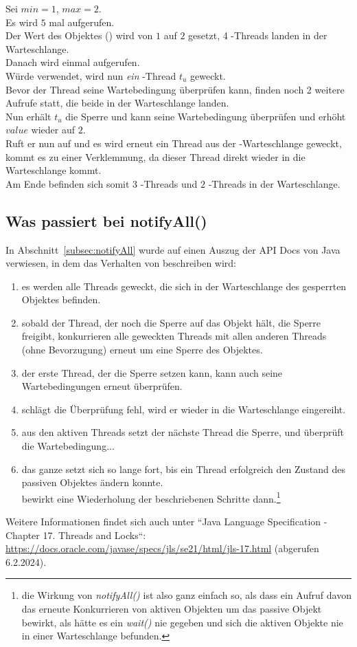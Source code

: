 \noindent
Sei $min = 1$, $max = 2$.\\
Es wird $5$ mal  aufgerufen.\\
Der Wert des Objektes () wird von $1$ auf $2$ gesetzt, 4 -Threads landen in der Warteschlange.\\
Danach wird einmal  aufgerufen.\\
Würde  verwendet, wird nun \textit{ein} -Thread $t_u$ geweckt.\\
Bevor der Thread seine Wartebedingung überprüfen kann, finden noch 2 weitere  Aufrufe statt, die beide in der Warteschlange landen.\\
Nun erhält $t_u$ die Sperre und kann seine Wartebedingung überprüfen und erhöht $value$ wieder auf $2$.\\
Ruft er nun  auf und es wird erneut ein Thread aus der -Warteschlange geweckt, kommt es zu einer Verklemmung, da dieser Thread direkt wieder in die Warteschlange kommt.\\
Am Ende befinden sich somit $3$ -Threads und $2$ -Threads in der Warteschlange.


\subsection*{Was passiert bei notifyAll()}

In Abschnitt~\ref{subsec:notifyAll} wurde auf einen Auszug der API Docs von Java verwiesen, in dem das Verhalten von  beschreiben wird:

\begin{enumerate}
    \item es werden alle Threads geweckt, die sich in der Warteschlange des gesperrten Objektes befinden.
    \item sobald der Thread, der noch die Sperre auf das Objekt hält, die Sperre freigibt, konkurrieren alle geweckten Threads mit allen anderen Threads (ohne Bevorzugung) erneut um eine Sperre des Objektes.
    \item der erste Thread, der die Sperre setzen kann, kann auch seine Wartebedingungen erneut überprüfen.
    \item schlägt die Überprüfung fehl, wird er wieder in die Warteschlange eingereiht.
    \item aus den aktiven Threads setzt der nächste Thread die Sperre, und überprüft die Wartebedingung...
    \item das ganze setzt sich so lange fort, bis ein Thread erfolgreich den Zustand des passiven Objektes ändern konnte.\\
     bewirkt eine Wiederholung der beschriebenen Schritte dann.\footnote{
        die Wirkung von \textit{notifyAll()} ist also ganz einfach so, als dass ein Aufruf davon das erneute Konkurrieren von aktiven Objekten um das passive Objekt bewirkt, als hätte es ein \textit{wait()} nie gegeben und sich die aktiven Objekte nie in einer Warteschlange befunden.
    }
\end{enumerate}

Weitere Informationen findet sich auch unter ``Java Language Specification - Chapter 17. Threads and Locks``: \url{https://docs.oracle.com/javase/specs/jls/se21/html/jls-17.html} (abgerufen 6.2.2024).
